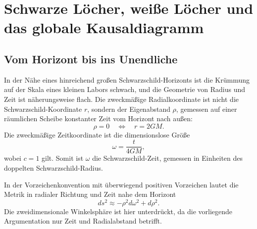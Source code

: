 \chapter{Schwarze Löcher, weiße Löcher und das globale Kausaldiagramm}


\section{Vom Horizont bis ins Unendliche}

In der Nähe eines hinreichend großen Schwarzschild-Horizonts ist die Krümmung auf der Skala eines kleinen Labors schwach, und die Geometrie von Radius und Zeit ist näherungsweise flach. Die zweckmäßige Radialkoordinate ist nicht die Schwarzschild-Koordinate \(r\), sondern der Eigenabstand \(\rho\), gemessen auf einer räumlichen Scheibe konstanter Zeit vom Horizont nach außen:
\begin{equation}
\rho=0 \quad\Longleftrightarrow\quad r=2GM .
\label{eq:l04-rho-horizon}
\end{equation}
Die zweckmäßige Zeitkoordinate ist die dimensionslose Größe
\begin{equation}
\omega=\frac{t}{4GM},
\label{eq:l04-omega}
\end{equation}
wobei \(c=1\) gilt. Somit ist \(\omega\) die Schwarzschild-Zeit, gemessen in Einheiten des doppelten Schwarzschild-Radius.

In der Vorzeichenkonvention mit überwiegend positiven Vorzeichen lautet die Metrik in radialer Richtung und Zeit nahe dem Horizont
\begin{equation}
ds^2\approx-\rho^2d\omega^2+d\rho^2.
\label{eq:l04-rindler}
\end{equation}
Die zweidimensionale Winkelsphäre ist hier unterdrückt, da die vorliegende Argumentation nur Zeit und Radialabstand betrifft.

